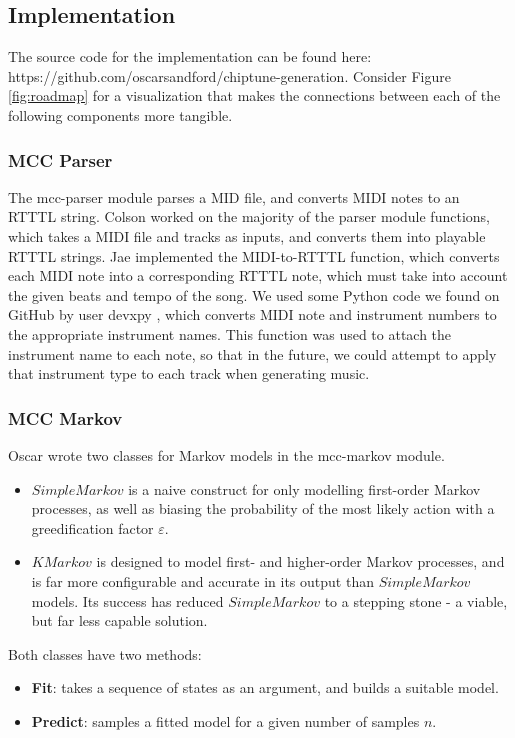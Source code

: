 \documentclass{article}
\begin{document}
\subsection{Implementation}
The source code for the implementation can be found here: https://github.com/oscarsandford/chiptune-generation. Consider Figure \ref{fig:roadmap} for a visualization that 
makes the connections between each of the following components more tangible.

\subsubsection{MCC Parser}
The mcc-parser module parses a MID file, and converts MIDI notes to an RTTTL string. Colson worked on the majority of the parser module functions, which takes a MIDI file and 
tracks as inputs, and converts them into playable RTTTL strings. Jae implemented the MIDI-to-RTTTL function, which converts each MIDI note into a corresponding RTTTL note, 
which must take into account the given beats and tempo of the song. We used some Python code we found on GitHub by user devxpy \cite{midi_instruments}, which converts MIDI 
note and instrument numbers to the appropriate instrument names. This function was used to attach the instrument name to each note, so that in the future, we could attempt 
to apply that instrument type to each track when generating music. 

\subsubsection{MCC Markov}
Oscar wrote two classes for Markov models in the mcc-markov module.
\begin{itemize}
  \item $SimpleMarkov$ is a naive construct for only modelling first-order Markov processes, as well as biasing the probability of the most likely action with a 
  greedification factor $\varepsilon$.
  \item $KMarkov$ is designed to model first- and higher-order Markov processes, and is far more configurable and accurate in its output than $SimpleMarkov$ models. 
  Its success has reduced $SimpleMarkov$ to a stepping stone - a viable, but far less capable solution.
\end{itemize}

Both classes have two methods: 
\begin{itemize}
  \item \textbf{Fit}: takes a sequence of states as an argument, and builds a suitable model.
  \item \textbf{Predict}: samples a fitted model for a given number of samples $n$.
\end{itemize}
\end{document}
